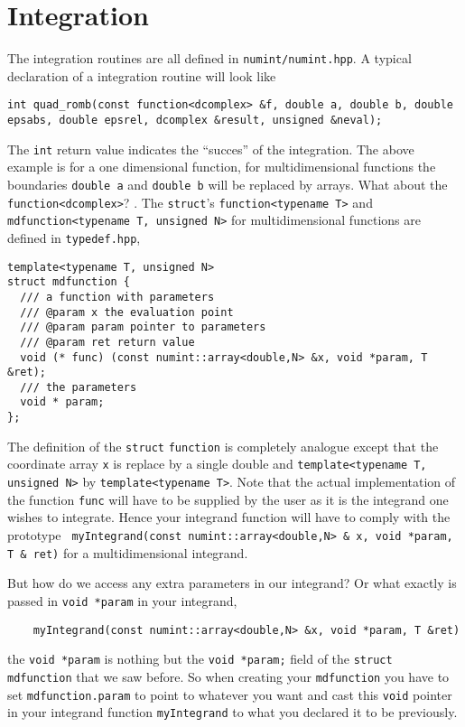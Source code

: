 
\section{Integration}

The integration routines are all defined in \texttt{numint/numint.hpp}. A typical declaration of a integration routine will look like
\begin{lstlisting}
int quad_romb(const function<dcomplex> &f, double a, double b, double epsabs, double epsrel, dcomplex &result, unsigned &neval);
\end{lstlisting}
The \texttt{int} return value indicates the ``succes'' of the integration. The above example is for a one dimensional function, for multidimensional functions the boundaries \texttt{double a} and \texttt{double b} will be replaced by arrays. What about the \texttt{function<dcomplex>}? . The \texttt{struct}'s \texttt{function<typename T>} and \texttt{mdfunction<typename T, unsigned N>} for multidimensional functions are defined in \texttt{typedef.hpp},
\begin{lstlisting}
template<typename T, unsigned N>
struct mdfunction {
  /// a function with parameters
  /// @param x the evaluation point
  /// @param param pointer to parameters
  /// @param ret return value
  void (* func) (const numint::array<double,N> &x, void *param, T &ret);
  /// the parameters
  void * param;
};
\end{lstlisting}
The definition of the \texttt{struct} \texttt{function} is completely analogue except that the coordinate array \texttt{x} is replace by a single double and \texttt{template<typename T, unsigned N>} by \texttt{template<typename T>}. Note that the actual implementation of the function \texttt{func} will have to be supplied by the user as it is the integrand one wishes to integrate. Hence your integrand function will have to comply with the prototype \texttt{ myIntegrand(const numint::array<double,N> \& x, void *param, T \& ret)} for a multidimensional integrand.

But how do we access any extra parameters in our integrand? Or what exactly is passed in \texttt{void *param} in your integrand,
\begin{lstlisting}
	myIntegrand(const numint::array<double,N> &x, void *param, T &ret)
\end{lstlisting}
the \texttt{void *param} is nothing but the \texttt{void *param;} field of the \texttt{struct mdfunction} that we saw before. So when creating your \texttt{mdfunction} you have to set \texttt{mdfunction.param} to point to whatever you want and cast this \texttt{void} pointer in your integrand function \texttt{myIntegrand} to what you declared it to be previously.
